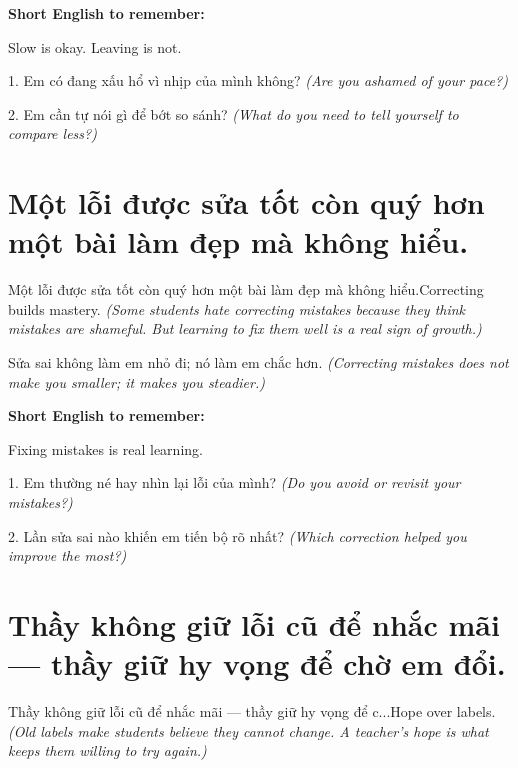 \begin{ghinhoanh}
\textbf{Short English to remember:}

Slow is okay. Leaving is not.

\end{ghinhoanh}

\begin{tuhocnhanh}
1. Em có đang xấu hổ vì nhịp của mình không? \textit{(Are you ashamed of your pace?)}

2. Em cần tự nói gì để bớt so sánh? \textit{(What do you need to tell yourself to compare less?)}
\end{tuhocnhanh}
\ngancach


\section{Một lỗi được sửa tốt còn quý hơn một bài làm đẹp mà không hiểu.}
\begin{truyen}{Một lỗi được sửa tốt còn quý hơn một bài làm đẹp mà không hiểu.}{Correcting builds mastery.}
\textit{(Some students hate correcting mistakes because they think mistakes are shameful. But learning to fix them well is a real sign of growth.)}
\end{truyen}

\begin{baihoc}
Sửa sai không làm em nhỏ đi; nó làm em chắc hơn.
\textit{(Correcting mistakes does not make you smaller; it makes you steadier.)}
\end{baihoc}

\begin{ghinhoanh}
\textbf{Short English to remember:}

Fixing mistakes is real learning.

\end{ghinhoanh}

\begin{tuhocnhanh}
1. Em thường né hay nhìn lại lỗi của mình? \textit{(Do you avoid or revisit your mistakes?)}

2. Lần sửa sai nào khiến em tiến bộ rõ nhất? \textit{(Which correction helped you improve the most?)}
\end{tuhocnhanh}
\ngancach


\section{Thầy không giữ lỗi cũ để nhắc mãi — thầy giữ hy vọng để chờ em đổi.}
\begin{truyen}{Thầy không giữ lỗi cũ để nhắc mãi — thầy giữ hy vọng để c...}{Hope over labels.}
\textit{(Old labels make students believe they cannot change. A teacher's hope is what keeps them willing to try again.)}
\end{truyen}

